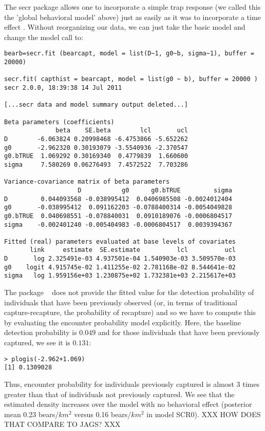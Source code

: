 The {\Ttt secr} package allows one to incorporate a simple trap response
 (we called this the 'global behavioral model' above) just as easily as it was to incorporate a time effect .
Without reorganizing our data, we can just take
the basic model and change the model call to:
{\small
\begin{verbatim}
bearb=secr.fit (bearcapt, model = list(D~1, g0~b, sigma~1), buffer = 20000)

secr.fit( capthist = bearcapt, model = list(g0 ~ b), buffer = 20000 )
secr 2.0.0, 18:39:38 14 Jul 2011

[...secr data and model summary output deleted...]

Beta parameters (coefficients)
              beta    SE.beta        lcl       ucl
D        -6.063824 0.20998468 -6.4753866 -5.652262
g0       -2.962320 0.30193079 -3.5540936 -2.370547
g0.bTRUE  1.069292 0.30169340  0.4779839  1.660600
sigma     7.580269 0.06276493  7.4572522  7.703286

Variance-covariance matrix of beta parameters
                    D           g0      g0.bTRUE         sigma
D         0.044093568 -0.038995412  0.0406985508 -0.0024012404
g0       -0.038995412  0.091162203 -0.0788400314 -0.0054049828
g0.bTRUE  0.040698551 -0.078840031  0.0910189076 -0.0006804517
sigma    -0.002401240 -0.005404983 -0.0006804517  0.0039394367

Fitted (real) parameters evaluated at base levels of covariates
       link     estimate  SE.estimate          lcl          ucl
D       log 2.325491e-03 4.937501e-04 1.540903e-03 3.509570e-03
g0    logit 4.915745e-02 1.411255e-02 2.781168e-02 8.544641e-02
sigma   log 1.959156e+03 1.230875e+02 1.732381e+03 2.215617e+03
\end{verbatim}
}
The package \secr~ does not provide the fitted value for the detection
probability of individuals that have been previously observed (or, in terms of traditional capture-recapture, the probability of recapture) and so we have to
compute this by evaluating the encounter probability model explicitly.
Here, the baseline
detection probability is $0.049$ and for those individuals that have
been previously captured, we see it is $0.131$:
\begin{verbatim}
> plogis(-2.962+1.069)
[1] 0.1309028
\end{verbatim}
Thus, encounter probability for individuals previously captured is
almost 3 times greater than that of individuals
not previously captured.  We see that the
estimated density increases over the model with no behavioral effect
(posterior mean 0.23
bears/$km^2$ versus 0.16 bears/$km^2$ in model SCR0).
XXX HOW DOES THAT COMPARE TO JAGS? XXX

